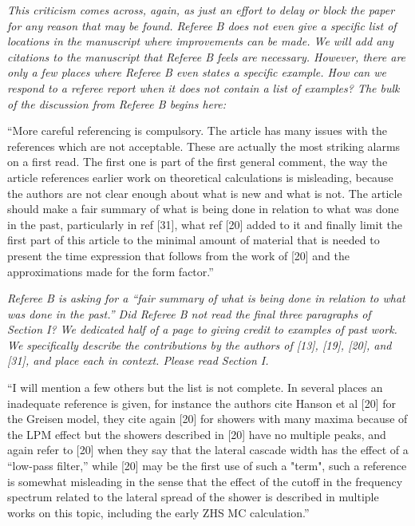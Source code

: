 \documentclass[12pt]{article}
\begin{document}
\textit{This criticism comes across, again, as just an effort to delay or block the paper for any reason that may be found.  Referee B does not even give a specific list of locations in the manuscript where improvements can be made.  We will add any citations to the manuscript that Referee B feels are necessary.  However, there are only a few places where Referee B even states a specific example.  How can we respond to a referee report when it does not contain a list of examples?  The bulk of the discussion from Referee B begins here:}

``More careful referencing is compulsory. The article has many issues with the references which are not acceptable. These are actually the most striking alarms on a first read. The first one is part of the first general comment, the way the article references earlier work on theoretical calculations is misleading, because the authors are not clear enough about what is new and what is not. The article should make a fair summary of what is being done in relation to what was done in the past, particularly in ref [31], what ref [20] added to it and finally limit the first part of this article to the minimal amount of material that is needed to present the time expression that follows from the work of [20] and the approximations made for the form factor.''

\textit{Referee B is asking for a ``fair summary of what is being done in relation to what was done in the past.''  Did Referee B not read the final three paragraphs of Section I?  We dedicated half of a page to giving credit to examples of past work.  We specifically describe the contributions by the authors of [13], [19], [20], and [31], and place each in context.  Please read Section I.}

``I will mention a few others but the list is not complete.  In several places an inadequate reference is given, for instance the authors cite Hanson et al [20] for the Greisen model, they cite again [20] for showers with many maxima because of the LPM effect but the showers described in [20] have no multiple peaks, and again refer to [20] when they say that the lateral cascade width has the effect of a ``low-pass filter,'' while [20] may be the first use of such a "term", such a reference is somewhat misleading in the sense that the effect of the cutoff in the frequency spectrum related to the lateral spread of the shower is described in multiple works on this topic, including the early ZHS MC calculation.''
\end{document}

